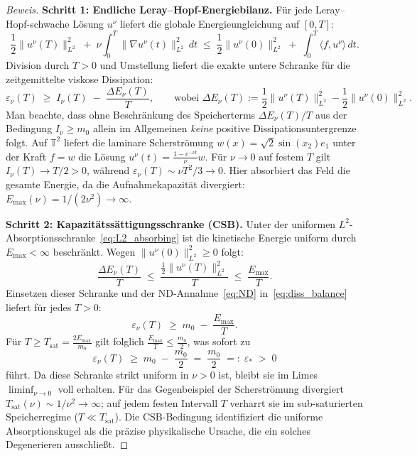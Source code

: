 \documentclass[12pt,a4paper]{article}
\theoremstyle{breakdef}
\theoremstyle{breakplain}
\theoremstyle{breakdef}
\begin{document}
\begin{proof}[Beweis]
\textbf{Schritt 1: Endliche Leray--Hopf-Energiebilanz.}\quad
Für jede Leray--Hopf-schwache Lösung $u^\nu$ liefert die globale Energieungleichung auf $[0, T]$:
\begin{equation}\label{eq:LH_ineq}
  \frac{1}{2}\|u^\nu(T)\|_{L^2}^2 \;+\; \nu \int_0^T \|\nabla u^\nu(t)\|_{L^2}^2\,dt
  \;\le\;
  \frac{1}{2}\|u^\nu(0)\|_{L^2}^2 \;+\; \int_0^T \langle f, u^\nu \rangle\,dt.
\end{equation}
Division durch $T > 0$ und Umstellung liefert die exakte untere Schranke für die zeitgemittelte viskose Dissipation:
\begin{equation}\label{eq:diss_balance}
  \varepsilon_\nu(T) \;\ge\; I_\nu(T) \;-\; \frac{\Delta E_\nu(T)}{T},
  \qquad \text{wobei } \Delta E_\nu(T) := \frac{1}{2}\|u^\nu(T)\|_{L^2}^2 - \frac{1}{2}\|u^\nu(0)\|_{L^2}^2.
\end{equation}
Man beachte, dass ohne Beschränkung des Speicherterms $\Delta E_\nu(T)/T$ aus der Bedingung $I_\nu \ge m_0$ allein im Allgemeinen \emph{keine} positive Dissipationsuntergrenze folgt. Auf $\mathbb{T}^2$ liefert die laminare Scherströmung $w(x)=\sqrt{2}\sin(x_2)e_1$ unter der Kraft $f=w$ die Lösung $u^\nu(t) = \frac{1-e^{-\nu t}}{\nu}w$. Für $\nu \to 0$ auf festem $T$ gilt $I_\nu(T) \to T/2 > 0$, während $\varepsilon_\nu(T) \sim \nu T^2/3 \to 0$. Hier absorbiert das Feld die gesamte Energie, da die Aufnahmekapazität divergiert: $E_{\max}(\nu) = 1/(2\nu^2) \to \infty$.

\textbf{Schritt 2: Kapazitätssättigungsschranke (CSB).}\quad
Unter der uniformen $L^2$-Absorptionsschranke~\eqref{eq:L2_absorbing} ist die kinetische Energie uniform durch $E_{\max} < \infty$ beschränkt. Wegen $\|u^\nu(0)\|_{L^2}^2 \ge 0$ folgt:
\begin{equation}\label{eq:storage_bound}
  \frac{\Delta E_\nu(T)}{T} \;\le\; \frac{\frac{1}{2}\|u^\nu(T)\|_{L^2}^2}{T} \;\le\; \frac{E_{\max}}{T}.
\end{equation}
Einsetzen dieser Schranke und der ND-Annahme~\eqref{eq:ND} in~\eqref{eq:diss_balance} liefert für jedes $T > 0$:
\begin{equation}\label{eq:CSB_step}
  \varepsilon_\nu(T) \;\ge\; m_0 \;-\; \frac{E_{\max}}{T}.
\end{equation}
Für $T \ge T_{\mathrm{sat}} = \frac{2 E_{\max}}{m_0}$ gilt folglich $\frac{E_{\max}}{T} \le \frac{m_0}{2}$, was sofort zu
\begin{equation}\label{eq:CSB_lower}
  \varepsilon_\nu(T) \;\ge\; m_0 \;-\; \frac{m_0}{2} \;=\; \frac{m_0}{2} \;=:\; \varepsilon_* \;>\; 0
\end{equation}
führt. Da diese Schranke strikt uniform in $\nu > 0$ ist, bleibt sie im Limes $\liminf_{\nu \to 0}$ voll erhalten. Für das Gegenbeispiel der Scherströmung divergiert $T_{\mathrm{sat}}(\nu) \sim 1/\nu^2 \to \infty$; auf jedem festen Intervall $T$ verharrt sie im sub-saturierten Speicherregime ($T \ll T_{\mathrm{sat}}$). Die CSB-Bedingung identifiziert die uniforme Absorptionskugel als die präzise physikalische Ursache, die ein solches Degenerieren ausschließt.


\end{proof}
\end{document}
